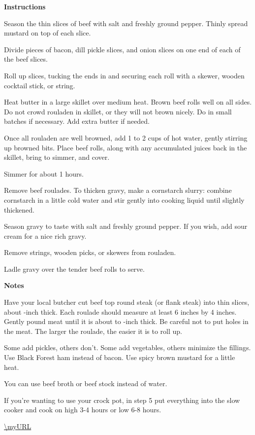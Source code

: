 \documentclass[../book.tex]{subfiles}
\begin{document}
  \begin{minipage}[t]{0.6\textwidth}
    {\large\bfseries Instructions}
    \begin{myMethod}
    \item Season the thin slices of beef with salt and freshly ground pepper. Thinly spread
      mustard on top of each slice.
    \item Divide pieces of bacon, dill pickle slices, and onion slices on one end of each of the
      beef slices.
    \item Roll up slices, tucking the ends in and securing each roll with a skewer, wooden
      cocktail stick, or string.
    \item Heat butter in a large skillet over medium heat. Brown beef rolls well on all sides. Do
      not crowd rouladen in skillet, or they will not brown nicely. Do in small batches if
      necessary. Add extra butter if needed.
    \item Once all rouladen are well browned, add 1 to 2 cups of hot water, gently stirring up
      browned bits. Place beef rolls, along with any accumulated juices back in the skillet, bring
      to simmer, and cover.
    \item Simmer for about 1 hours.
    \item Remove beef roulades. To thicken gravy, make a cornstarch slurry: combine cornstarch in
      a little cold water and stir gently into cooking liquid until slightly thickened.
    \item Season gravy to taste with salt and freshly ground pepper. If you wish, add sour cream
      for a nice rich gravy.
    \item Remove strings, wooden picks, or skewers from rouladen.
    \item Ladle gravy over the tender beef rolls to serve.
    \end{myMethod}
  \end{minipage}
  \vspace{1ex}
  {\large\bfseries Notes}
  \begin{mying}
  \item Have your local butcher cut beef top round steak (or flank steak) into
    thin slices, about -inch thick. Each roulade should measure at
    least 6 inches by 4 inches. Gently pound meat until it is about
     to -inch thick. Be careful not to put holes in
    the meat. The larger the roulade, the easier it is to roll up.
  \item Some add pickles, others don't. Some add vegetables, others minimize the
    fillings. Use Black Forest ham instead of bacon. Use spicy brown mustard for
    a little heat.
  \item You can use beef broth or beef stock instead of water.
  \item If you're wanting to use your crock pot, in step 5 put everything into
    the slow cooker and cook on high 3-4 hours or low 6-8 hours.
  \end{mying}
  \vfill
  \centering\url{\myURL}
\end{document}
